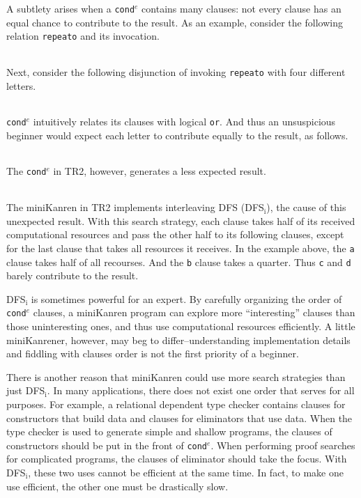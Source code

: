 \documentclass[format=acmlarge, review=true, authordraft=true]{acmart}
\newcommand{\conde}{\texttt{cond$^e$}}
\newcommand{\clisting}[1]{
\begin{center}
  \begin{tabular}{c}
	
    \end{tabular}
\end{center}
}
\newcommand{\DFSi }[0]{DFS$_\textrm{i}$}
\begin{document}
A subtlety arises 
when a \conde{} contains many clauses: not every clause has an 
equal chance to contribute to the result. As an example, consider the following 
relation \texttt{repeato} and its invocation. 

\clisting{Figures/repeato.rkt}

Next, consider the following disjunction of invoking \texttt{repeato} with four 
different letters.

\clisting{Figures/example.rkt}

\conde{} intuitively relates its clauses with logical \texttt{or}. And thus an 
unsuspicious beginner would expect each letter to contribute equally to the 
result, as follows.

\clisting{Figures/run-repeato-fair.rkt}

The \conde{} in TR2, however, generates a less expected result.

\clisting{Figures/run-repeato-idfs.rkt}

The miniKanren in TR2 implements interleaving DFS (\DFSi), the cause of this 
unexpected result. With this search strategy, each clause takes half 
of its received computational resources and pass the other half to its 
following clauses, except for the last clause that takes all resources it 
receives. In the example above, the \texttt{a} clause takes half of all 
recourses. And the \texttt{b} clause takes a quarter. Thus \texttt{c} and 
\texttt{d} barely contribute to the result.


\DFSi{} is sometimes powerful for an expert. By carefully organizing the order 
of \conde{} clauses, a miniKanren program can explore more ``interesting'' 
clauses than those uninteresting ones, and thus use computational resources 
efficiently. A little miniKanrener, however, may beg to differ--understanding
implementation details and fiddling with clauses order is not the first
priority of a beginner.

There is another reason that miniKanren could use more search strategies than
just \DFSi. In many applications, there does not exist one order that serves
for all purposes. For example, a relational dependent type checker contains
clauses for constructors that build data and clauses for eliminators that use
data. When the type checker is used to generate simple and shallow programs,
the clauses of constructors should be put in the front of \conde.
When performing proof searches for complicated programs, the clauses of 
eliminator should take the focus. With \DFSi, these two uses cannot be 
efficient at the same time. In fact, to make one use efficient, the other one 
must be drastically slow.
\end{document}
